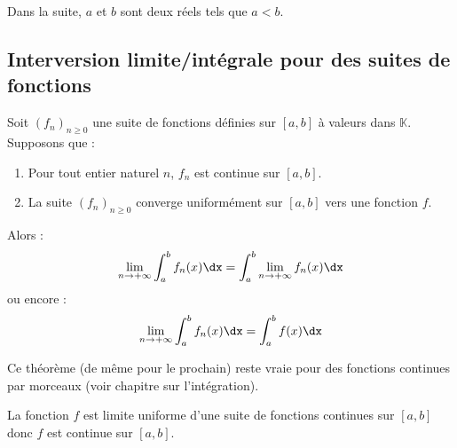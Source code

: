 \documentclass[a4paper,10pt]{report}
\begin{document}
Dans la suite, $a$ et $b$ sont deux réels tels que $a<b$.

\subsection{Interversion limite/intégrale pour des suites de fonctions}

\begin{Theoreme}{} Soit $(f_n)_{n \geq 0}$ une suite de fonctions définies sur $[a,b]$ à valeurs dans $\mathbb{K}$. Supposons que :

\begin{enumerate}
\item Pour tout entier naturel $n$, $f_n$ est continue sur $[a,b]$.
\item La suite $(f_n)_{n \geq 0}$ converge uniformément sur $[a,b]$ vers une fonction $f$.
\end{enumerate}
Alors :
$$ \lim_{n \rightarrow + \infty} \int_{a}^b f_n(x) \dx = \int_{a}^b \lim_{n \rightarrow + \infty} f_n(x) \dx$$
ou encore :
$$  \lim_{n \rightarrow + \infty} \int_{a}^b f_n(x) \dx = \int_{a}^b f(x) \dx$$
\end{Theoreme}

\begin{Remarque}{} Ce théorème (de même pour le prochain) reste vraie pour des fonctions continues par morceaux (voir chapitre sur l'intégration).
\end{Remarque}

\begin{Demonstration}{} La fonction $f$ est limite uniforme d'une suite de fonctions continues sur $[a,b]$ donc $f$ est continue sur $[a,b]$. 
%
%

\vspace{9cm}
\end{Demonstration}
\end{document}
